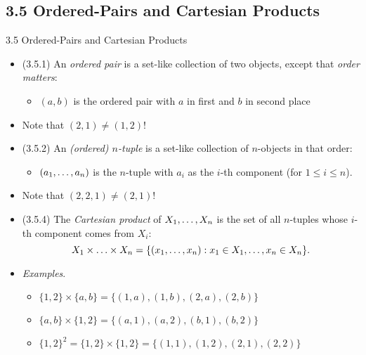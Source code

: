 \documentclass[../slides.tex]{subfiles}
\begin{document}
\subsection{3.5 Ordered-Pairs and Cartesian Products}
\begin{frame}{3.5 Ordered-Pairs and Cartesian Products}

	\begin{itemize}
	
		\item (3.5.1) An \emph{ordered pair} is a set-like collection of two objects, except that \emph{order matters}:
		
			\begin{itemize}
			
				\item $(a,b)$ is the ordered pair with $a$ in first and $b$ in second place
			
			\end{itemize}
			
		\item Note that $(2,1)\neq (1,2)$!
			
		\item (3.5.2) An \emph{(ordered) $n$-tuple} is a set-like collection of $n$-objects in that order:
		
		\begin{itemize}
		
			\item $(a_1, \mathellipsis, a_n)$ is the $n$-tuple with $a_i$ as the $i$-th component (for $1\leq i\leq n$).
		
		\end{itemize}
		
		\item Note that $(2,2,1)\neq (2,1)$!
		
		\item (3.5.4) The \emph{Cartesian product} of $X_1, \mathellipsis, X_n$ is the set of all $n$-tuples whose $i$-th component comes from $X_i$: \[X_1\times \mathellipsis\times X_n=\{(x_1, \mathellipsis, x_n):x_1\in X_1, \mathellipsis, x_n\in X_n\}.\]

		
		\item \emph{Examples}. 
		
		\begin{itemize}
		
			\item $\{1,2\}\times \{a,b\}=\{(1,a), (1,b), (2,a), (2,b)\}$
			
			\item $\{a,b\}\times \{1,2\}=\{(a,1), (a,2), (b,1), (b,2)\}$
			
			\item $\{1,2\}^2=\{1,2\}\times\{1,2\}=\{(1,1), (1,2), (2,1), (2,2)\}$
		
		\end{itemize}

	
	\end{itemize}

\end{frame}
\end{document}
